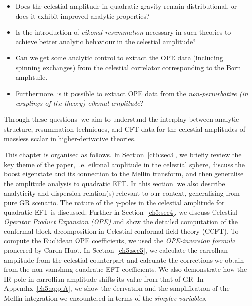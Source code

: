 \begin{itemize}
    \item Does the celestial amplitude in quadratic gravity remain distributional, or does it exhibit improved analytic properties?
    \item Is the introduction of \textit{eikonal resummation} necessary in such theories to achieve better analytic behaviour in the celestial amplitude?
    \item Can we get some analytic control to extract the OPE data (including spinning exchanges) from the celestial correlator corresponding to the Born amplitude.
    \item Furthermore, is it possible to extract OPE data from the \textit{non-perturbative (in couplings of the theory) eikonal amplitude}?
\end{itemize}
Through these questions, we aim to understand the interplay between analytic structure, resummation techniques, and CFT data for the celestial amplitudes of massless scalar in higher-derivative theories.
\par
This chapter is organised as follows. In Section~\eqref{ch5:sec3}, we briefly review the key theme of the paper, i.e. eikonal amplitude in the celestial sphere, discuss the boost eigenstate and its connection to the Mellin transform, and then generalise the amplitude analysis to quadratic EFT. In this section, we also describe analyticity and dispersion relation(s) relevant to our context, generalising from pure GR scenario. The nature of the $\gamma$-poles in the celestial amplitude for quadratic EFT is discussed. Further in Section~\eqref{ch5:sec4}, we discuss Celestial \textit{Operator Product Expansion (OPE)} and show the detailed computation of the conformal block decomposition in Celestial conformal field theory (CCFT). To compute the Euclidean OPE coefficients, we used the \textit{OPE-inversion formula} pioneered by Caron-Huot. In Section~\eqref{ch5:sec5}, we calculate the carrollian amplitude from the celestial counterpart and calculate the corrections we obtain from the non-vanishing quadratic EFT coefficients. We also demonstrate how the IR pole in carrollian amplitude shifts its value from that of GR. In Appendix~\ref {ch5:app:A}, we show the derivation and the simplification of the Mellin integration we encountered in terms of the \textit{simplex variables}.

